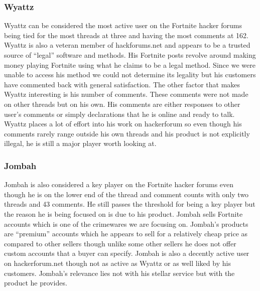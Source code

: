 \documentclass[sigconf]{acmart}
\begin{document}
\subsubsection{Wyattz}
Wyattz can be considered the most active user on the Fortnite hacker forums being tied for the most threads at three and having the most comments at 162. Wyattz is also a veteran member of hackforums.net and appears to be a trusted source of “legal” software and methods. His Fortnite posts revolve around making money playing Fortnite using what he claims to be a legal method. Since we were unable to access his method we could not determine its legality but his customers have commented back with general satisfaction. The other factor that makes Wyattz interesting is his number of comments. These comments were not made on other threads but on his own. His comments are either responses to other user’s comments or simply declarations that he is online and ready to talk. Wyattz places a lot of effort into his work on hackerforum so even though his comments rarely range outside his own threads and his product is not explicitly illegal, he is still a major player worth looking at.

\subsubsection{Jombah}
Jombah is also considered a key player on the Fortnite hacker forums even though he is on the lower end of the thread and comment counts with only two threads and 43 comments. He still passes the threshold for being a key player but the reason he is being focused on is due to his product. Jombah sells Fortnite accounts which is one of the crimewares we are focusing on. Jombah’s products are “premium” accounts which he appears to sell for a relatively cheap price as compared to other sellers though unlike some other sellers he does not offer custom accounts that a buyer can specify. Jombah is also a decently active user on hackerforum.net though not as active as Wyattz or as well liked by his customers. Jombah’s relevance lies not with his stellar service but with the product he provides.
\end{document}
